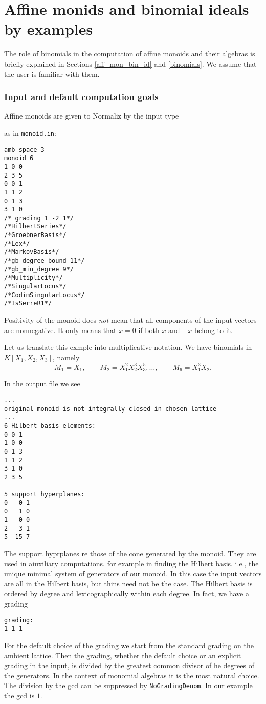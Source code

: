\section{Affine monids and binomial ideals by examples}\label{AffMon}

The role of binomials in the computation of affine monoids and their algebras is briefly explained in Sections \ref{aff_mon_bin_id} and \ref{binomials}. We assume that the user is familiar with them.

\subsubsection{Input and default computation goals}
Affine monoids are given to Normaliz by the input type 
\begin{itemize}
	\itemtt[monoid]
\end{itemize}
as in \verb|monoid.in|:
\begin{Verbatim}
amb_space 3
monoid 6
1 0 0
2 3 5
0 0 1
1 1 2
0 1 3
3 1 0
/* grading 1 -2 1*/
/*HilbertSeries*/
/*GroebnerBasis*/
/*Lex*/
/*MarkovBasis*/
/*gb_degree_bound 11*/
/*gb_min_degree 9*/
/*Multiplicity*/
/*SingularLocus*/
/*CodimSingularLocus*/
/*IsSerreR1*/
\end{Verbatim}
Positivity of the monoid does \emph{not} mean that all components of the input vectors are nonnegative. It only means that $x=0$ if both $x$ and $-x$ belong to it.

Let us translate this exmple into multiplicative notation. We have binomials in $K[X_1,X_2,X_3]$, namely 
$$
M_1 = X_1,\qquad M_2 = X_1^2X_2^3X_3^5,\dots, \qquad M_6 =X_1^3X_2.
$$

In the output file we see
\begin{Verbatim}
...
original monoid is not integrally closed in chosen lattice
...
6 Hilbert basis elements:
0 0 1
1 0 0
0 1 3
1 1 2
3 1 0
2 3 5

5 support hyperplanes:
0   0 1
0   1 0
1   0 0
2  -3 1
5 -15 7
\end{Verbatim}
The support hyprplanes re those of the cone generated by the monoid. They are used in aiuxiliary computations, for example in finding the Hilbert basis, i.e., the unique minimal system of generators of our monoid. In this case the input vectors are all in the Hilbert basis, but thins need not be the case. The Hilbert basis is ordered by degree and lexicographically within each degree. In fact, we have a grading
\begin{Verbatim}
grading:
1 1 1 
\end{Verbatim}
For the default choice of the grading we start from the standard grading on the ambient lattice. Then the grading, whether the default choice or an explicit grading in the input, is divided by the greatest common divisor of he degrees of the generators. In the context of monomial algebras it is the most natural choice. The division by the gcd can be suppressed by \verb|NoGradingDenom|. In our example the gcd is $1$.

